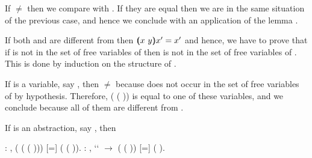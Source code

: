 \begin{coqdoccode}
\end{coqdoccode}
If  \ensuremath{\not=}  then we compare  with . If they are equal then we are in the same situation of the previous case, and hence we conclude with an application of the lemma . 
\begin{coqdoccode}
\end{coqdoccode}
If both  and  are different from  then $(\!\!(x\ y)\!\!) x' = x'$ and hence, we have to prove that if  is not in the set of free variables of  then  is not in the set of free variables of    . This is done by induction on the structure of . 
\begin{coqdoccode}
\end{coqdoccode}
If  is a variable, say , then  \ensuremath{\not=}  because  does not occur in the set of free variables of  by hypothesis. Therefore,  (   ( )) is equal to one of these variables, and we conclude because all of them are different from . 
\begin{coqdoccode}
\end{coqdoccode}
If  is an abstraction, say   , then  
\begin{coqdoccode}
\coqdocemptyline
\coqdocnoindent
{} : \coqdockw{\ensuremath{\forall}}   ,\coqdoceol
\coqdocindent{2.00em}
  (  ( (   ))) [=]   (  ( )).\coqdoceol
\coqdocemptyline
\coqdocnoindent
{} : \coqdockw{\ensuremath{\forall}}   ,  ``   \ensuremath{\rightarrow}   ( (   )) [=]   ( ).\coqdoceol
 \end{coqdoccode}
